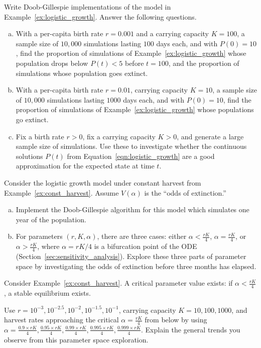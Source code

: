 \begin{exercises}
\begin{enumerate}[(a)]
\begin{enumerate}[(a)]
\end{enumerate}
\end{enumerate}


\item \label{ex:hw_logistic_growth_sim}
Write Doob-Gillespie implementations of the model in Example~\ref{ex:logistic_growth}. Answer the following questions.
\begin{enumerate}[(a)]
\item With a per-capita birth rate $r = 0.001$ and a carrying capacity $K = 100$, a sample size of $10,000$ simulations lasting $100$ days each, and with $P(0) = 10$, find the proportion of simulations of Example~\ref{ex:logistic_growth} whose population drops below $P(t) < 5$ before $t = 100$, and the proportion of simulations whose population goes extinct.
\item With a per-capita birth rate $r = 0.01$, carrying capacity $K = 10$, a sample size of $10,000$ simulations lasting $1000$ days each, and with $P(0) = 10$, find the proportion of simulations of Example~\ref{ex:logistic_growth} whose populations go extinct.
\item Fix a birth rate $r > 0$, fix a carrying capacity $K > 0$, and generate a large sample size of simulations. Use these to investigate whether the continuous solutions $P(t)$ from Equation~\ref{eqn:logistic_growth} are a good approximation for the expected state at time $t$.
\end{enumerate}

\item \label{ex:hw_const_harvest_sim}
Consider the logistic growth model under constant harvest from Example~\ref{ex:const_harvest}. Assume $V(\alpha)$ is the ``odds of extinction.''
\begin{enumerate}[(a)]
\item Implement the Doob-Gillespie algorithm for this model which simulates one year of the population.
\item For parameters $(r, K, \alpha)$, there are three cases: either $\alpha < \frac{rK}{4}$, $\alpha = \frac{rK}{4}$, or $\alpha > \frac{rK}{4}$, where $\alpha = rK/4$ is a bifurcation point of the ODE (Section~\ref{sec:sensitivity_analysis}). Explore these three parts of parameter space by investigating the odds of extinction before three months has elapsed.
\end{enumerate}

\item \label{ex:hw_const_harvest_sensitivity}
Consider Example~\ref{ex:const_harvest}. A critical parameter value exists: if $\alpha < \frac{rK}{4}$, a stable equilibrium exists.
\begin{sloppypar}
Use $r = 10^{-3}, 10^{-2.5}, 10^{-2}, 10^{-1.5}, 10^{-1}$, carrying capacity $K = 10, 100, 1000$, and harvest rates approaching the critical $\alpha = \frac{rK}{4}$ from below by using $\alpha = \frac{0.9\times rK}{4}, \frac{0.95\times rK}{4}, \frac{0.99\times rK}{4}, \frac{0.995\times rK}{4}, \frac{0.999\times rK}{4}$. Explain the general trends you observe from this parameter space exploration.
\end{sloppypar}


\end{exercises}
